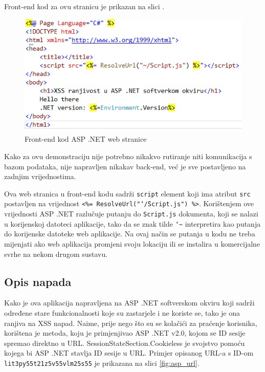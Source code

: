 \documentclass[12pt, oneside, onecolumn]{book}
\begin{document}
{Front-end kod za ovu stranicu je prikazan na slici . 

\begin{figure}[H]
	\begin{center}
		\includegraphics[width=\textwidth]{asp_f.jpg}
		\caption{Front-end kod ASP .NET web stranice} \label{fig:asp_f}
	\end{center}
\end{figure}

Kako za ovu demonstraciju nije potrebno nikakvo rutiranje niti komunikacija s bazom podataka, nije napravljen nikakav back-end, već je sve postavljeno na zadnjim vrijednostima.

Ova web stranica u front-end kodu sadrži \texttt{script} element koji ima atribut \texttt{src} postavljen na vrijednost \texttt{<\%= ResolveUrl("\char`\~/Script.js") \%>}. Korištenjem ove vrijednosti ASP .NET razlučuje putanju do \texttt{Script.js} dokumenta, koji se nalazi u korijenskoj datoteci aplikacije, tako da se znak tilde \texttt{\char`\~} interpretira kao putanja do korijenske datoteke web aplikacije. Na ovaj način se putanja u kodu ne treba mijenjati ako web aplikacija promjeni svoju lokaciju ili se instalira u komercijalne svrhe na nekom drugom sustavu.

\subsection{Opis napada}
Kako je ova aplikacija napravljena na ASP .NET softverskom okviru koji sadrži određene stare funkcionalnosti koje su zastarjele i ne koriste se, tako je ona ranjiva na XSS napad. Naime, prije nego što su se kolačići za praćenje korisnika, korištena je metoda, koju je primjenjivao ASP .NET v2.0, kojom se ID sesije spremao direktno u URL. SessionStateSection.Cookieless je svojstvo pomoću kojega bi ASP .NET stavlja ID sesije u URL. Primjer opisanog URL-a s ID-om \texttt{lit3py55t21z5v55vlm25s55} je prikazana na slici \ref{fig:asp_url}.

}
\end{document}
